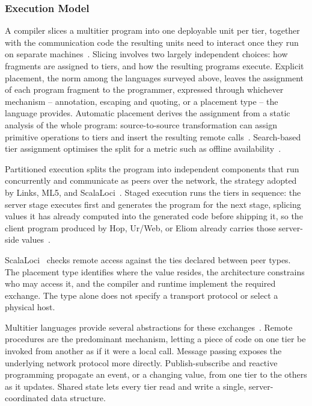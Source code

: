 \subsubsection{Execution Model}
\label{subsubsec:multitier-execution-model}

A compiler slices a multitier program into one deployable unit per tier,
together with the communication code the resulting units need to interact once they run on separate machines~\cite{DBLP:journals/csur/WeisenburgerWS20}.
%
Slicing involves two largely independent choices:
how fragments are assigned to tiers,
and how the resulting programs execute.
%
Explicit placement, the norm among the languages surveyed above, leaves the assignment of each program fragment to the programmer, expressed through whichever mechanism -- annotation, escaping and quoting, or a placement type -- the language provides.
%
Automatic placement derives the assignment from a static analysis of the whole program:
source-to-source transformation can assign primitive operations to tiers and insert the resulting remote calls~\cite{10.1145/1040305.1040324}.
%
Search-based tier assignment optimises the split for a metric such as offline availability~\cite{Philips:2018}.

Partitioned execution splits the program into independent components that run concurrently and communicate as peers over the network, the strategy adopted by Links, ML5, and ScalaLoci~\cite{DBLP:conf/fmco/CooperLWY06,10.5555/1793574.1793585,DBLP:journals/pacmpl/WeisenburgerKS18}.
%
Staged execution runs the tiers in sequence:
the server stage executes first and generates the program for the next stage,
splicing values it has already computed into the generated code before shipping it,
so the client program produced by Hop, Ur/Web, or Eliom already carries those server-side values~\cite{DBLP:conf/oopsla/SerranoGL06,10.1145/2676726.2677004,Radanne:2016}.

ScalaLoci~\cite{DBLP:journals/pacmpl/WeisenburgerKS18} checks remote access against the ties declared between peer types.
The placement type identifies where the value resides,
the architecture constrains who may access it,
and the compiler and runtime implement the required exchange.
The type alone does not specify a transport protocol or select a physical host.

Multitier languages provide several abstractions for these exchanges~\cite{DBLP:journals/csur/WeisenburgerWS20}.
%
Remote procedures are the predominant mechanism, letting a piece of code on one tier be invoked from another as if it were a local call.
%
Message passing exposes the underlying network protocol more directly.
%
Publish-subscribe and reactive programming propagate an event, or a changing value, from one tier to the others as it updates.
%
Shared state lets every tier read and write a single, server-coordinated data structure.

